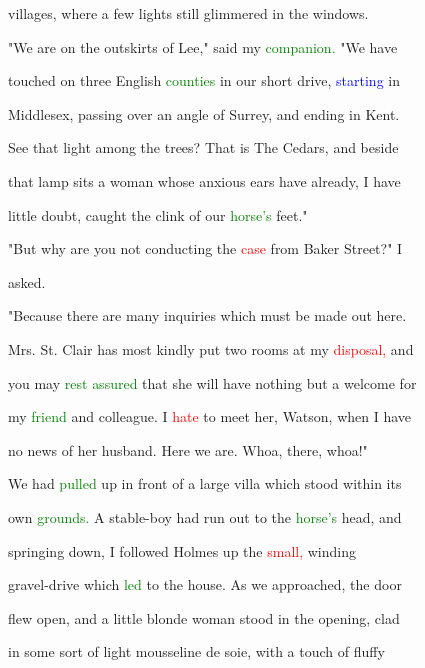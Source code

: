  villages, where a few lights still \textcolor{BurntOrange}{glimmered} in the windows.



 "We are on the outskirts of Lee," said my \textcolor{green}{companion.} "We have

 touched on three English \textcolor{green}{counties} in our short drive, \textcolor{blue}{starting} in

 Middlesex, passing over an angle of Surrey, and ending in Kent.

 See that light among the \textcolor{BurntOrange}{trees?} That is The Cedars, and beside

 that lamp sits a woman whose \textcolor{BurntOrange}{anxious} ears have already, I have

 little \textcolor{BurntOrange}{doubt,} caught the clink of our \textcolor{green}{horse's} feet."



 "But why are you not conducting the \textcolor{red}{case} from Baker Street?" I

 asked.



 "Because there are many \textcolor{BurntOrange}{inquiries} which must be made out here.

 Mrs. St. Clair has most kindly put two rooms at my \textcolor{red}{disposal,} and

 you may \textcolor{green}{rest} \textcolor{green}{assured} that she will have nothing but a welcome for

 my \textcolor{green}{friend} and colleague. I \textcolor{red}{hate} to meet her, Watson, when I have

 no news of her husband. Here we are. Whoa, there, whoa!"



 We had \textcolor{green}{pulled} up in front of a large villa which stood within its

 own \textcolor{green}{grounds.} A stable-boy had run out to the \textcolor{green}{horse's} head, and

 springing down, I followed Holmes up the \textcolor{red}{small,} winding

 gravel-drive which \textcolor{green}{led} to the house. As we approached, the door

 flew open, and a little blonde woman stood in the opening, clad

 in some sort of light mousseline de soie, with a touch of fluffy

